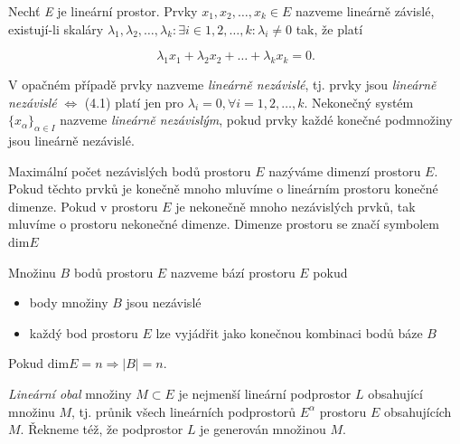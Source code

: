 \begin{definition}
Nechť \textit{E} je lineární prostor. Prvky $x_1, x_2, \ldots, x_k \in E$ nazveme lineárně závislé, existují-li skaláry $\lambda_1, \lambda_2,\ldots,\lambda_k: \exists i \in {1, 2, \ldots, k} : \lambda_i \neq 0 $ tak, že platí 

\begin{equation}
\lambda_1 x_1 + \lambda_2 x_2 + \ldots + \lambda_k x_k = 0.
\end{equation} 

V opačném případě prvky nazveme \textit{lineárně nezávislé}, tj. prvky jsou \textit{lineárně nezávislé} $\Leftrightarrow $ (4.1) platí jen pro  $\lambda_i =0, \forall i = 1, 2, \ldots, k.$ Nekonečný systém $\lbrace x_{\alpha}\rbrace _{\alpha\in I}$ nazveme \textit{lineárně nezávislým}, pokud prvky každé konečné podmnožiny jsou lineárně nezávislé. 
\end{definition}

\begin{definition}
Maximální počet nezávislých bodů prostoru $E$ nazýváme dimenzí prostoru $E$. Pokud těchto prvků je konečně mnoho mluvíme o lineárním prostoru konečné dimenze. Pokud v prostoru $E$ je nekonečně mnoho nezávislých prvků, tak mluvíme o prostoru nekonečné dimenze. Dimenze prostoru se značí symbolem $\mathrm{dim}E$
\end{definition}

\begin{definition}
Množinu $B$ bodů prostoru $E$ nazveme bází prostoru $E$ pokud
\begin{itemize}
\item body množiny $B$ jsou nezávislé 
\item každý bod prostoru $E$ lze vyjádřit jako konečnou kombinaci bodů báze $B$
\end{itemize}
Pokud $\mathrm{dim}E=n \Rightarrow |B|=n$.
\end{definition}

\begin{definition}
\textit{Lineární obal } množiny $M\subset E$ je nejmenší lineární podprostor $L$ obsahující množinu $M$, tj. průnik všech lineárních podprostorů $E^{\alpha}$ prostoru $E$ obsahujících $M$. Řekneme též, že podprostor $L$ je generován množinou $M$.
\end{definition}

